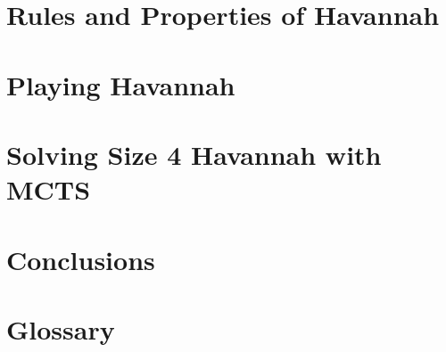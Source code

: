 \documentclass[12pt, letterpaper]{report}
\renewcommand{\baselinestretch}{1.33}
\numberwithin{equation}{section}
\begin{document}
  \chapter[Havannah]{\label{havannah} \LARGE Rules and Properties of Havannah}
  

  \chapter[Playing Havannah]{\label{playing} \LARGE Playing Havannah }
  

  \chapter[Solving Size 4 Havannah!]{\label{solving} \LARGE Solving Size 4 Havannah with MCTS}
  

  \chapter[Conclusions]{\label{conclusion} \LARGE Conclusions}
  
  
  \appendix

  \chapter[Glossary]{\label{glossary} \LARGE Glossary}
  

%    
  
  
  \small
  \renewcommand{\baselinestretch}{0.25}
  
\end{document}
